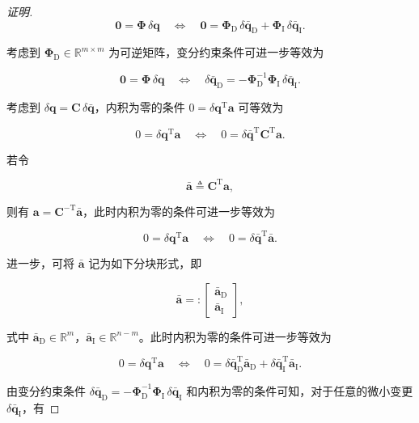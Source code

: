 \begin{proof}[证明]
\[
\boldsymbol{0}=\boldsymbol{\Phi}\,\delta\boldsymbol{q}\quad\Leftrightarrow\quad\boldsymbol{0}=\boldsymbol{\Phi}_{\mathrm{D}}\,\delta\bar{\boldsymbol{q}}_{\mathrm{D}}+\boldsymbol{\Phi}_{\mathrm{I}}\,\delta\bar{\boldsymbol{q}}_{\mathrm{I}}.
\]

考虑到 $\boldsymbol{\Phi}_{\mathrm{D}}\in\mathbb{R}^{m\times m}$ 为可逆矩阵，变分约束条件可进一步等效为

\[
\boldsymbol{0}=\boldsymbol{\Phi}\,\delta\boldsymbol{q}\quad\Leftrightarrow\quad\delta\bar{\boldsymbol{q}}_{\mathrm{D}}=-\boldsymbol{\Phi}_{\mathrm{D}}^{-1}\boldsymbol{\Phi}_{\mathrm{I}}\,\delta\bar{\boldsymbol{q}}_{\mathrm{I}}.
\]

考虑到 $\delta\boldsymbol{q}=\boldsymbol{C}\,\delta\bar{\boldsymbol{q}}$，内积为零的条件 $0=\delta\boldsymbol{q}^{\mathrm{T}}\boldsymbol{a}$ 可等效为

\[
0=\delta\boldsymbol{q}^{\mathrm{T}}\boldsymbol{a}\quad\Leftrightarrow\quad0=\delta\bar{\boldsymbol{q}}^{\mathrm{T}}\boldsymbol{C}^{\mathrm{T}}\boldsymbol{a}.
\]

若令

\[
\bar{\boldsymbol{a}}\triangleq\boldsymbol{C}^{\mathrm{T}}\boldsymbol{a},
\]

则有 $\boldsymbol{a}=\boldsymbol{C}^{-\mathrm{T}}\bar{\boldsymbol{a}}$，此时内积为零的条件可进一步等效为

\[
0=\delta\boldsymbol{q}^{\mathrm{T}}\boldsymbol{a}\quad\Leftrightarrow\quad0=\delta\bar{\boldsymbol{q}}^{\mathrm{T}}\bar{\boldsymbol{a}}.
\]

进一步，可将 $\bar{\boldsymbol{a}}$ 记为如下分块形式，即

\[
\bar{\boldsymbol{a}}=:\begin{bmatrix}\bar{\boldsymbol{a}}_{\mathrm{D}}\\\bar{\boldsymbol{a}}_{\mathrm{I}}\end{bmatrix},
\]

式中 $\bar{\boldsymbol{a}}_{\mathrm{D}}\in\mathbb{R}^m$，$\bar{\boldsymbol{a}}_{\mathrm{I}}\in\mathbb{R}^{n-m}$。此时内积为零的条件可进一步等效为

\[
0=\delta\boldsymbol{q}^{\mathrm{T}}\boldsymbol{a}\quad\Leftrightarrow\quad0=\delta\bar{\boldsymbol{q}}_{\mathrm{D}}^{\mathrm{T}}\bar{\boldsymbol{a}}_{\mathrm{D}}+\delta\bar{\boldsymbol{q}}_{\mathrm{I}}^{\mathrm{T}}\bar{\boldsymbol{a}}_{\mathrm{I}}.
\]

由变分约束条件 $\delta\bar{\boldsymbol{q}}_{\mathrm{D}}=-\boldsymbol{\Phi}_{\mathrm{D}}^{-1}\boldsymbol{\Phi}_{\mathrm{I}}\,\delta\bar{\boldsymbol{q}}_{\mathrm{I}}$ 和内积为零的条件可知，对于任意的微小变更 $\delta\bar{\boldsymbol{q}}_{\mathrm{I}}$，有


\end{proof}

